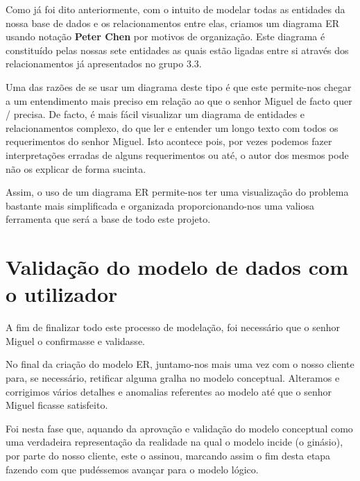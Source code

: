 Como já foi dito anteriormente, com o intuito de modelar todas as entidades da nossa base de dados e os relacionamentos entre elas, criamos um diagrama ER usando notação \textbf{Peter Chen} por motivos de organização. Este diagrama é constituído pelas nossas sete entidades as quais estão ligadas entre si através dos relacionamentos já apresentados no grupo 3.3.\par
Uma das razões de se usar um diagrama deste tipo é que este permite-nos chegar a um entendimento mais preciso em relação ao que o senhor Miguel de facto quer / precisa. De facto, é mais fácil visualizar um diagrama de entidades e relacionamentos complexo, do que ler e entender um longo texto com todos os requerimentos do senhor Miguel. Isto acontece pois, por vezes podemos fazer interpretações erradas de alguns requerimentos ou até, o autor dos mesmos pode não os explicar de forma sucinta.\par
Assim, o uso de um diagrama ER permite-nos ter uma visualização do problema bastante mais simplificada e organizada proporcionando-nos uma valiosa ferramenta que será a base de todo este projeto. 

\section{Validação do modelo de dados com o utilizador}

A fim de finalizar todo este processo de modelação, foi necessário que o senhor Miguel o confirmasse e validasse.\par
No final da criação do modelo ER, juntamo-nos mais uma vez com o nosso cliente para, se necessário, retificar alguma gralha no modelo conceptual. 
Alteramos e corrigimos vários detalhes e anomalias referentes ao modelo até que o senhor Miguel ficasse satisfeito.\par
Foi nesta fase que, aquando da aprovação e validação do modelo conceptual como uma  verdadeira representação da realidade na qual o modelo incide (o ginásio), por parte do nosso cliente, este o assinou, marcando assim o fim desta etapa fazendo com que pudéssemos avançar para o modelo lógico.





